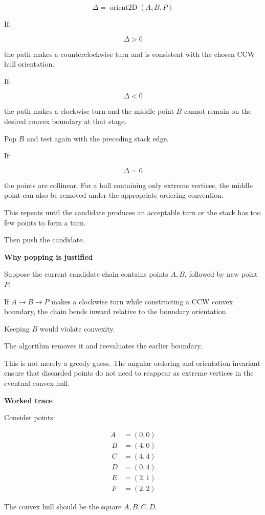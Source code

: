 \[
\Delta=\operatorname{orient2D}(A,B,P)
\]

If:

\[
\Delta>0
\]

the path makes a counterclockwise turn and is consistent with the chosen CCW hull orientation.

If:

\[
\Delta<0
\]

the path makes a clockwise turn and the middle point \(B\) cannot remain on the desired convex boundary at that stage.

Pop \(B\) and test again with the preceding stack edge.

If:

\[
\Delta=0
\]

the points are collinear. For a hull containing only extreme vertices, the middle point can also be removed under the appropriate ordering convention.

This repeats until the candidate produces an acceptable turn or the stack has too few points to form a turn.

Then push the candidate.

\textbf{Why popping is justified}

Suppose the current candidate chain contains points \(A,B\), followed by new point \(P\).

If \(A\rightarrow B\rightarrow P\) makes a clockwise turn while constructing a CCW convex boundary, the chain bends inward relative to the boundary orientation.

Keeping \(B\) would violate convexity.

The algorithm removes it and reevaluates the earlier boundary.

This is not merely a greedy guess. The angular ordering and orientation invariant ensure that discarded points do not need to reappear as extreme vertices in the eventual convex hull.

\textbf{Worked trace}

Consider points:

\[
\begin{aligned} A&=(0,0)\\\ B&=(4,0)\\\ C&=(4,4)\\\ D&=(0,4)\\\ E&=(2,1)\\\ F&=(2,2) \end{aligned}
\]

The convex hull should be the square \(A,B,C,D\).

